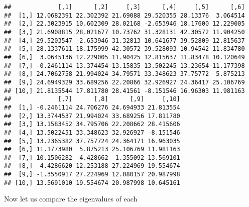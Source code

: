 \documentclass[]{article}
\newenvironment{Shaded}{\begin{snugshade}}{\end{snugshade}}
\newcommand{\KeywordTok}[1]{\textcolor[rgb]{0.13,0.29,0.53}{\textbf{{#1}}}}
\newcommand{\DataTypeTok}[1]{\textcolor[rgb]{0.13,0.29,0.53}{{#1}}}
\newcommand{\DecValTok}[1]{\textcolor[rgb]{0.00,0.00,0.81}{{#1}}}
\newcommand{\StringTok}[1]{\textcolor[rgb]{0.31,0.60,0.02}{{#1}}}
\newcommand{\NormalTok}[1]{{#1}}
\begin{document}
\begin{verbatim}
##             [,1]      [,2]     [,3]      [,4]     [,5]      [,6]
##  [1,] 12.0682391 22.302392 21.69088 29.520355 28.13376  3.064514
##  [2,] 22.3023915 10.602309 28.02168 -2.653946 18.17600 12.229005
##  [3,] 21.6908815 28.021677 10.73762 31.328131 42.30572 11.904250
##  [4,] 29.5203547 -2.653946 31.32813 10.641677 39.52809 12.815637
##  [5,] 28.1337611 18.175999 42.30572 39.528093 10.94542 11.834780
##  [6,]  3.0645136 12.229005 11.90425 12.815637 11.83478 10.120649
##  [7,] -0.2461114 13.374454 13.15835 13.502245 13.23654 11.177398
##  [8,] 24.7062758 21.994024 34.79571 33.348623 37.75772  5.875213
##  [9,] 24.6949329 33.689256 22.20866 32.926927 24.36417 25.106769
## [10,] 21.8135544 17.811780 28.41561 -8.151546 16.96303 11.981163
##             [,7]      [,8]      [,9]     [,10]
##  [1,] -0.2461114 24.706276 24.694933 21.813554
##  [2,] 13.3744537 21.994024 33.689256 17.811780
##  [3,] 13.1583452 34.795706 22.208662 28.415606
##  [4,] 13.5022451 33.348623 32.926927 -8.151546
##  [5,] 13.2365382 37.757724 24.364171 16.963035
##  [6,] 11.1773980  5.875213 25.106769 11.981163
##  [7,] 10.1506282  4.428662 -1.355092 13.569101
##  [8,]  4.4286620 12.253188 27.224969 19.554674
##  [9,] -1.3550917 27.224969 12.080157 20.987998
## [10,] 13.5691010 19.554674 20.987998 10.645161
\end{verbatim}

Now let us compare the eigenvalues of each

\begin{Shaded}
\end{Shaded}
\end{document}
